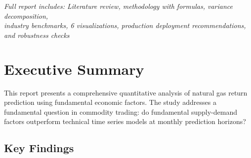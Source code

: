\documentclass[12pt,a4paper]{article}
\begin{document}
\noindent{}

\vspace{0.2cm}

\begin{center}
\small \textit{Full report includes: Literature review, methodology with formulas, variance decomposition, \\
industry benchmarks, 6 visualizations, production deployment recommendations, and robustness checks}
\end{center}


\tableofcontents
\newpage

\section{Executive Summary}

This report presents a comprehensive quantitative analysis of natural gas return prediction using fundamental economic factors. The study addresses a fundamental question in commodity trading: do fundamental supply-demand factors outperform technical time series models at monthly prediction horizons?

\subsection{Key Findings}
\end{document}
